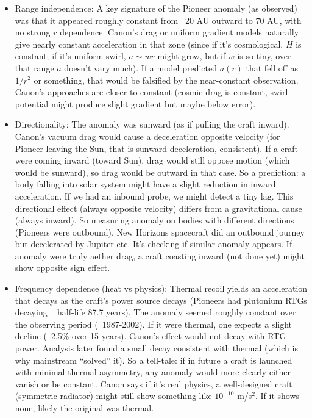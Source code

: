 \documentclass[11pt]{article}
\begin{document}
\begin{itemize}

\item 
Range independence: A key signature of the Pioneer anomaly (as observed) was that it appeared roughly constant from ~20 AU outward to 70 AU, with no strong $r$ dependence. Canon’s drag or uniform gradient models naturally give nearly constant acceleration in that zone (since if it’s cosmological, $H$ is constant; if it’s uniform swirl, $a \sim w r$ might grow, but if $w$ is so tiny, over that range $a$ doesn’t vary much). If a model predicted $a(r)$ that fell off as $1/r^2$ or something, that would be falsified by the near-constant observation. Canon’s approaches are closer to constant (cosmic drag is constant, swirl potential might produce slight gradient but maybe below error).




\item 
Directionality: The anomaly was sunward (as if pulling the craft inward). Canon’s vacuum drag would cause a deceleration opposite velocity (for Pioneer leaving the Sun, that is sunward deceleration, consistent). If a craft were coming inward (toward Sun), drag would still oppose motion (which would be sunward), so drag would be outward in that case. So a prediction: a body falling into solar system might have a slight reduction in inward acceleration. If we had an inbound probe, we might detect a tiny lag. This directional effect (always opposite velocity) differs from a gravitational cause (always inward). So measuring anomaly on bodies with different directions (Pioneers were outbound). New Horizons spacecraft did an outbound journey but decelerated by Jupiter etc. It's checking if similar anomaly appears. If anomaly were truly aether drag, a craft coasting inward (not done yet) might show opposite sign effect.




\item 
Frequency dependence (heat vs physics): Thermal recoil yields an acceleration that decays as the craft’s power source decays (Pioneers had plutonium RTGs decaying ~ half-life 87.7 years). The anomaly seemed roughly constant over the observing period (~1987-2002). If it were thermal, one expects a slight decline (~2.5\% over 15 years). Canon’s effect would not decay with RTG power. Analysis later found a small decay consistent with thermal (which is why mainstream “solved” it). So a tell-tale: if in future a craft is launched with minimal thermal asymmetry, any anomaly would more clearly either vanish or be constant. Canon says if it’s real physics, a well-designed craft (symmetric radiator) might still show something like $10^{-10}$ m/s$^2$. If it shows none, likely the original was thermal.





\end{itemize}
\end{document}
